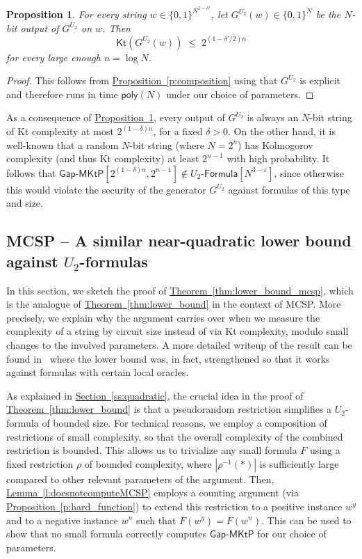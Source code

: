 \documentclass[11pt]{article}
\numberwithin{equation}{section}
\newtheorem{proposition}[theorem]{Proposition}
\theoremstyle{definition}
\theoremstyle{plain}
\newcommand{\expref}[2]{\hyperref[#2]{#1~\ref{#2}}}
\newcommand{\gapmktp}{\mathsf{Gap}$-$\mathsf{MKtP}}
\newcommand{\Kt}{\mathsf{Kt}}
\begin{document}
\begin{proposition}\label{prop:PRG_Kt}
For every string $w \in \{0,1\}^{N^{1 - \delta'}}$, let $G^{U_2}(w) \in \{0,1\}^N$ be the $N$-bit output of $G^{U_2}$ on $w$. Then
$$
\Kt(G^{U_2}(w)) \;\leq\; 2^{(1 - \delta'/2)n}
$$ 
for every large enough $n = \log N$.
\end{proposition}

\begin{proof}
This follows from \expref{Proposition}{p:composition} using that $G^{U_2}$ is explicit and therefore runs in time $\mathsf{poly}(N)$ under our choice of parameters.
\end{proof}

As a consequence of \expref{Proposition}{prop:PRG_Kt}, every output of $G^{U_2}$ is always an $N$-bit string of Kt complexity at most $2^{(1 - \delta)n}$, for a fixed $\delta > 0$. On the other hand, it is well-known that a random $N$-bit string (where $N = 2^n$) has Kolmogorov complexity (and thus Kt complexity) at least $2^{n - 1}$ with high probability. It follows that $\gapmktp[2^{(1 - \delta)n}, 2^{n - 1}] \notin U_2$-$\mathsf{Formula}[N^{3 - \varepsilon}]$, since otherwise this would violate the security of the generator $G^{U_2}$ against formulas of this type and size. 




\subsection{MCSP -- A similar near-quadratic lower bound against $U_2$-formulas}\label{ss:quadratic_mcsp}

In this section, we sketch the proof of \expref{Theorem}{thm:lower_bound_mcsp}, which is the analogue of \expref{Theorem}{thm:lower_bound} in the context of MCSP. More precisely, we explain why the argument carries over when we measure the complexity of a string by circuit size instead of via Kt complexity, modulo small changes to the involved parameters. A more detailed writeup of the result can be found in~\cite{chen_et_al:LIPIcs:2020:11755} where the lower bound was, in fact, strengthened so that it works against formulas with certain local oracles.

As explained in \expref{Section}{ss:quadratic}, the crucial idea in the proof of \expref{Theorem}{thm:lower_bound} is that a pseudorandom restriction simplifies a $U_2$-formula of bounded size. For technical reasons, we employ a composition of restrictions of small complexity, so that the overall complexity of the combined restriction is bounded. This allows us to trivialize any small formula $F$ using a fixed restriction $\rho$ of bounded complexity, where $|\rho^{-1}(*)|$ is sufficiently large compared to other relevant parameters of the argument. Then, \expref{Lemma}{l:doesnotcomputeMCSP} employs a counting argument (via \expref{Proposition}{p:hard_function}) to extend this restriction to a positive instance $w^y$ and to a negative instance $w^n$ such that $F(w^y) = F(w^n)$.  This can be used to show that no small formula correctly computes $\gapmktp$ for our choice of parameters.
\end{document}
